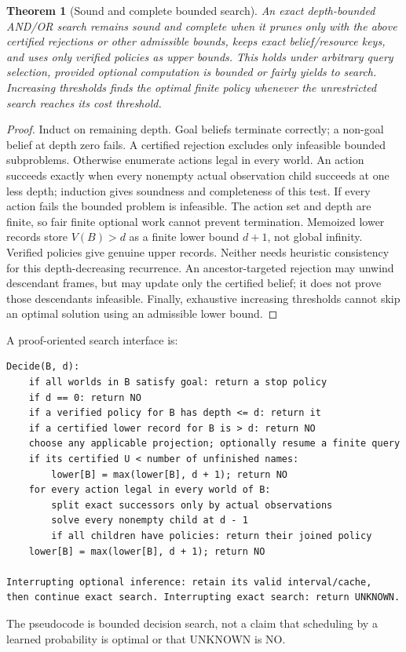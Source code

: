 \documentclass[11pt]{article}
\newtheorem{theorem}{Theorem}[section]
\theoremstyle{definition}
\begin{document}
\begin{theorem}[Sound and complete bounded search]
An exact depth-bounded AND/OR search remains sound and complete when it prunes
only with the above certified rejections or other admissible bounds, keeps
exact belief/resource keys, and uses only verified policies as upper bounds.
This holds under arbitrary query selection, provided optional computation is
bounded or fairly yields to search. Increasing thresholds finds the optimal
finite policy whenever the unrestricted search reaches its cost threshold.
\end{theorem}
\begin{proof}
Induct on remaining depth. Goal beliefs terminate correctly; a non-goal belief
at depth zero fails. A certified rejection excludes only infeasible bounded
subproblems. Otherwise enumerate actions legal in every world. An action
succeeds exactly when every nonempty actual observation child succeeds at one
less depth; induction gives soundness and completeness of this test.
If every action fails the bounded problem is infeasible. The action set and
depth are finite, so fair finite optional work cannot prevent termination.
Memoized lower records store $V(B)>d$ as a finite lower bound $d+1$, not global
infinity. Verified policies give genuine upper records. Neither needs heuristic
consistency for this depth-decreasing recurrence. An ancestor-targeted rejection
may unwind descendant frames, but may update only the certified belief; it
does not prove those descendants infeasible. Finally, exhaustive increasing
thresholds cannot skip an optimal solution using an admissible lower bound.
\end{proof}

\noindent A proof-oriented search interface is:
\begin{verbatim}
Decide(B, d):
    if all worlds in B satisfy goal: return a stop policy
    if d == 0: return NO
    if a verified policy for B has depth <= d: return it
    if a certified lower record for B is > d: return NO
    choose any applicable projection; optionally resume a finite query
    if its certified U < number of unfinished names:
        lower[B] = max(lower[B], d + 1); return NO
    for every action legal in every world of B:
        split exact successors only by actual observations
        solve every nonempty child at d - 1
        if all children have policies: return their joined policy
    lower[B] = max(lower[B], d + 1); return NO

Interrupting optional inference: retain its valid interval/cache,
then continue exact search. Interrupting exact search: return UNKNOWN.
\end{verbatim}
The pseudocode is bounded decision search, not a claim that scheduling by a
learned probability is optimal or that UNKNOWN is NO.
\end{document}
